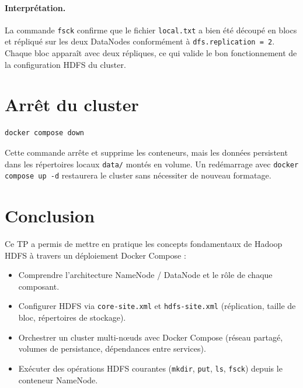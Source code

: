 \documentclass[11pt,a4paper]{article}
\begin{document}
\paragraph{Interprétation.}
La commande \texttt{fsck} confirme que le fichier \texttt{local.txt} a bien été découpé en blocs et répliqué sur les deux DataNodes conformément à \texttt{dfs.replication = 2}. Chaque bloc apparaît avec deux répliques, ce qui valide le bon fonctionnement de la configuration HDFS du cluster.


\section{Arrêt du cluster}

\begin{lstlisting}[language=bash]
docker compose down
\end{lstlisting}

Cette commande arrête et supprime les conteneurs, mais les données persistent dans les répertoires locaux \texttt{data/} montés en volume. Un redémarrage avec \texttt{docker compose up -d} restaurera le cluster sans nécessiter de nouveau formatage.


\section{Conclusion}

Ce TP a permis de mettre en pratique les concepts fondamentaux de Hadoop HDFS à travers un déploiement Docker Compose :
\begin{itemize}
  \item Comprendre l'architecture NameNode / DataNode et le rôle de chaque composant.
  \item Configurer HDFS via \texttt{core-site.xml} et \texttt{hdfs-site.xml} (réplication, taille de bloc, répertoires de stockage).
  \item Orchestrer un cluster multi-nœuds avec Docker Compose (réseau partagé, volumes de persistance, dépendances entre services).
  \item Exécuter des opérations HDFS courantes (\texttt{mkdir}, \texttt{put}, \texttt{ls}, \texttt{fsck}) depuis le conteneur NameNode.
\end{itemize}
\end{document}
